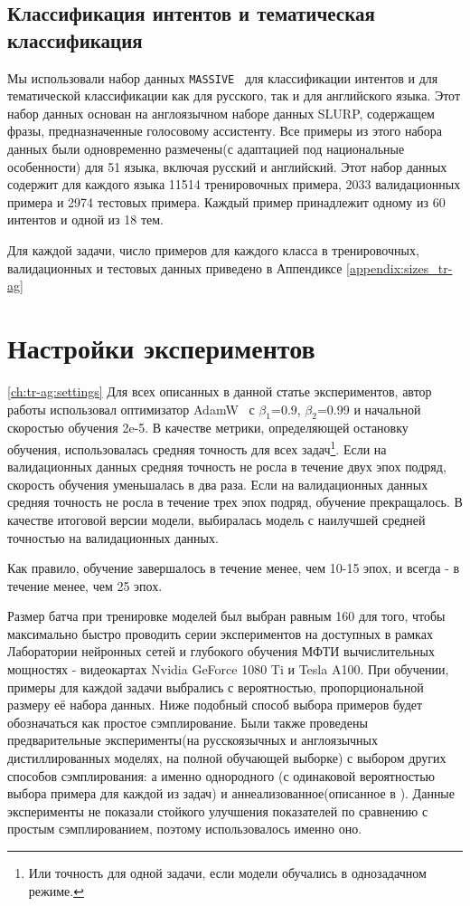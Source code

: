 \subsection{Классификация интентов и тематическая классификация }
Мы использовали набор данных \texttt{MASSIVE}~\cite{massive} для классификации интентов и для тематической классификации как для русского, так и для английского языка. Этот набор данных основан на англоязычном наборе данных SLURP\cite{clurp}, содержащем фразы, предназначенные голосовому ассистенту. 
 Все примеры из этого набора данных были одновременно размечены(с адаптацией под национальные особенности) для 51 языка, включая русский и английский. Этот набор данных содержит для каждого языка 11514 тренировочных примера, 2033 валидационных примера и 2974 тестовых примера. Каждый пример принадлежит одному из 60 интентов и одной из 18 тем. 

Для каждой задачи, число примеров для каждого класса в тренировочных, валидационных и тестовых данных приведено в Аппендиксе \ref{appendix:sizes_tr-ag} 

\section {Настройки экспериментов}\ref{ch:tr-ag:settings}
Для всех описанных в данной статье экспериментов, автор работы использовал оптимизатор AdamW~\cite{adam} с  $\beta_1$=0.9, $\beta_2$=0.99 и начальной скоростью обучения 2e-5. В качестве метрики, определяющей остановку обучения, использовалась средняя точность для всех задач\footnote{Или точность для одной задачи, если модели обучались в однозадачном режиме.}. Если на валидационных данных средняя точность не росла в течение двух эпох подряд, скорость обучения уменьшалась в два раза. Если на валидационных данных средняя точность не росла в течение трех эпох подряд, обучение прекращалось. В качестве итоговой версии модели, выбиралась модель с наилучшей средней точностью на валидационных данных. 

Как правило, обучение завершалось в течение менее, чем 10-15 эпох, и всегда - в течение менее, чем 25 эпох. 

Размер батча при тренировке моделей был выбран равным 160 для того, чтобы максимально быстро проводить серии экспериментов на доступных в рамках Лаборатории нейронных сетей и глубокого обучения МФТИ вычислительных мощностях - видеокартах Nvidia GeForce 1080 Ti и Tesla A100. 
При обучении, примеры для каждой задачи выбрались с вероятностью, пропорциональной размеру её набора данных. Ниже подобный способ выбора примеров будет обозначаться как простое сэмплирование. Были также проведены предварительные эксперименты(на русскоязычных и англоязычных дистиллированных моделях, на полной обучающей выборке) с выбором других способов сэмплирования: а именно однородного (с одинаковой вероятностью выбора примера для каждой из задач) и аннеализованное(описанное в \cite{PAL:19}). Данные эксперименты не показали стойкого улучшения показателей по сравнению с простым сэмплированием, поэтому использовалось именно оно. 

